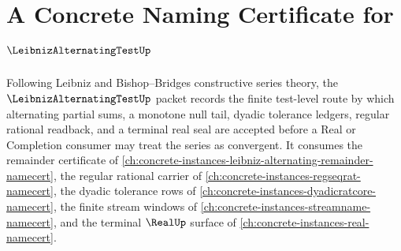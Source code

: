 \chapter{A Concrete Naming Certificate for $\LeibnizAlternatingTestUp$}
\label{ch:concrete-instances-leibniz-alternating-test-namecert}

Following Leibniz and Bishop--Bridges constructive series theory, the $\LeibnizAlternatingTestUp$ packet records the finite test-level route by which alternating partial sums, a monotone null tail, dyadic tolerance ledgers, regular rational readback, and a terminal real seal are accepted before a Real or Completion consumer may treat the series as convergent. It consumes the remainder certificate of \autoref{ch:concrete-instances-leibniz-alternating-remainder-namecert}, the regular rational carrier of \autoref{ch:concrete-instances-regseqrat-namecert}, the dyadic tolerance rows of \autoref{ch:concrete-instances-dyadicratcore-namecert}, the finite stream windows of \autoref{ch:concrete-instances-streamname-namecert}, and the terminal $\RealUp$ surface of \autoref{ch:concrete-instances-real-namecert}.

